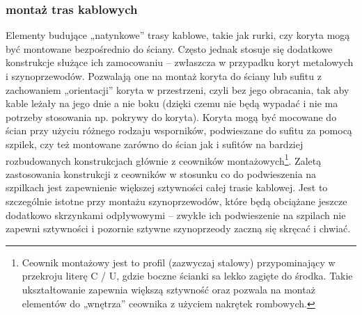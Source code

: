 \subsubsection{montaż tras kablowych}

Elementy budujące „natynkowe” trasy kablowe, takie jak rurki, czy koryta mogą być montowane bezpośrednio do ściany.
Często jednak stosuje się dodatkowe konstrukcje służące ich zamocowaniu – zwłaszcza w przypadku koryt metalowych i szynoprzewodów.
Pozwalają one na montaż koryta do ściany lub sufitu z zachowaniem „orientacji” koryta w przestrzeni,
	czyli bez jego obracania, tak aby kable leżały na jego dnie a nie boku (dzięki czemu nie będą wypadać i nie ma potrzeby stosowania np. pokrywy do koryta).
Koryta mogą być mocowane do ścian przy użyciu różnego rodzaju wsporników, podwieszane do sufitu za pomocą szpilek,
	czy też montowane zarówno do ścian jak i sufitów na bardziej rozbudowanych konstrukcjach głównie z ceowników montażowych\footnote{
		Ceownik montażowy jest to profil (zazwyczaj stalowy) przypominający w przekroju literę C / U, gdzie boczne ścianki sa lekko zagięte do środka.
		Takie ukształtowanie zapewnia większą sztywność oraz pozwala na montaż elementów do „wnętrza” ceownika z użyciem nakrętek rombowych.
	}.
Zaletą zastosowania konstrukcji z ceowników w stosunku co do podwieszenia na szpilkach jest zapewnienie większej sztywności całej trasie kablowej.
Jest to szczególnie istotne przy montażu szynoprzewodów, które będą obciążane jeszcze dodatkowo skrzynkami odpływowymi –
	zwykłe ich podwieszenie na szpilach nie zapewni sztywności i pozornie sztywne szynoprzeody zaczną się skręcać i chwiać.

